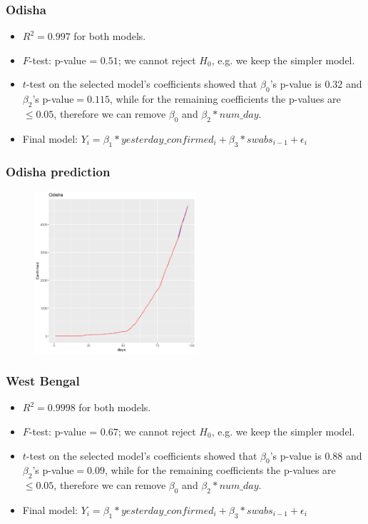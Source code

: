 \documentclass{beamer}
\begin{document}
\begin{frame}
\frametitle{Odisha}
\begin{itemize}
	\item $R^2 = 0.997$ for both models.
	\item $F$-test: p-value = $0.51$; we cannot reject $H_0$, e.g. we keep the simpler model.
	\item $t$-test on the selected model's coefficients showed that $\beta_0$'s p-value is $0.32$ and $\beta_2$'s p-value$=0.115$, while for the remaining coefficients the p-values are $\leq 0.05$, therefore we can remove $\beta_0$ and $\beta_2*num\_day$.
	\item Final model: $Y_i = \beta_1*yesterday\_confirmed_i + \beta_3*swabs_{i-1} + \epsilon_i $
\end{itemize}
\end{frame}

\begin{frame}
\frametitle{Odisha prediction}
\begin{figure}
	\includegraphics[width=\linewidth, height=6cm]{../plots/pred/normal/Odisha_predictions_final.png}
\end{figure}
\end{frame}


\begin{frame}
\frametitle{West Bengal}
\begin{itemize}
	\item $R^2 = 0.9998$ for both models.
	\item $F$-test: p-value = $0.67$; we cannot reject $H_0$, e.g. we keep the simpler model.
	\item $t$-test on the selected model's coefficients showed that $\beta_0$'s p-value is $0.88$ and $\beta_2$'s p-value$=0.09$, while for the remaining coefficients the p-values are $\leq 0.05$, therefore we can remove $\beta_0$ and $\beta_2*num\_day$.
	\item Final model: $Y_i = \beta_1*yesterday\_confirmed_i + \beta_3*swabs_{i-1} + \epsilon_i $
\end{itemize}
\end{frame}
\end{document}
